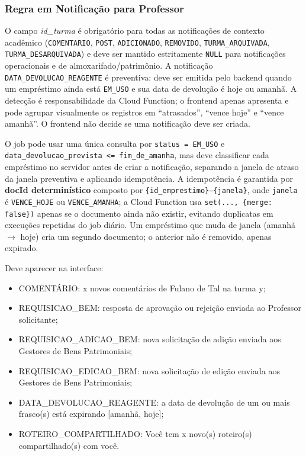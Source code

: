 \subsubsection{Regra em Notificação para Professor}
\begin{regra}
O campo \textit{id\_turma} é obrigatório para todas as notificações de contexto acadêmico (\texttt{COMENTARIO}, \texttt{POST}, \texttt{ADICIONADO}, \texttt{REMOVIDO}, \texttt{TURMA\_ARQUIVADA}, \texttt{TURMA\_DESARQUIVADA}) e deve ser mantido estritamente \texttt{NULL} para notificações operacionais e de almoxarifado/patrimônio. A notificação \texttt{DATA\_DEVOLUCAO\_REAGENTE} é preventiva: deve ser emitida pelo backend quando um empréstimo ainda está \texttt{EM\_USO} e sua data de devolução é hoje ou amanhã. A detecção é responsabilidade da Cloud Function; o frontend apenas apresenta e pode agrupar visualmente os registros em ``atrasados'', ``vence hoje'' e ``vence amanhã''. O frontend não decide se uma notificação deve ser criada.

O job pode usar uma única consulta por \texttt{status = EM\_USO} e \texttt{data\_devolucao\_prevista <= fim\_de\_amanha}, mas deve classificar cada empréstimo no servidor antes de criar a notificação, separando a janela de atraso da janela preventiva e aplicando idempotência. A idempotência é garantida por \textbf{docId determinístico} composto por \texttt{\{id\_emprestimo\}--\{janela\}}, onde \texttt{janela} é \texttt{VENCE\_HOJE} ou \texttt{VENCE\_AMANHA}; a Cloud Function usa \texttt{set(..., \{merge: false\})} apenas se o documento ainda não existir, evitando duplicatas em execuções repetidas do job diário. Um empréstimo que muda de janela (amanhã $\rightarrow$ hoje) cria um segundo documento; o anterior não é removido, apenas expirado.

Deve aparecer na interface:
\begin{itemize}
    \item COMENTÁRIO: x novos comentários de Fulano de Tal na turma y;
    \item REQUISICAO\_BEM: resposta de aprovação ou rejeição enviada ao Professor solicitante;
    \item REQUISICAO\_ADICAO\_BEM: nova solicitação de adição enviada aos Gestores de Bens Patrimoniais;
    \item REQUISICAO\_EDICAO\_BEM: nova solicitação de edição enviada aos Gestores de Bens Patrimoniais;
    \item DATA\_DEVOLUCAO\_REAGENTE: a data de devolução de um ou mais frasco(s) está expirando [amanhã, hoje];
    \item ROTEIRO\_COMPARTILHADO: Você tem x novo(s) roteiro(s) compartilhado(s) com você.
\end{itemize}
\end{regra}

